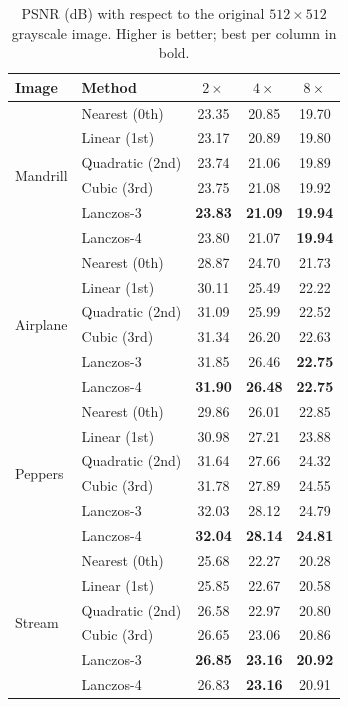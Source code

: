 \documentclass[11pt,a4paper]{article}
\begin{document}
\begin{table}[H]
\centering
\caption{PSNR (dB) with respect to the original $512\times512$ grayscale image. Higher is
better; best per column in bold.}
\label{tab:psnr}
\begin{tabular}{llccc}
\toprule
Image & Method & $2\times$ & $4\times$ & $8\times$ \\
\midrule
\multirow{6}{*}{Mandrill}
 & Nearest (0th)   & 23.35 & 20.85 & 19.70 \\
 & Linear (1st)    & 23.17 & 20.89 & 19.80 \\
 & Quadratic (2nd) & 23.74 & 21.06 & 19.89 \\
 & Cubic (3rd)     & 23.75 & 21.08 & 19.92 \\
 & Lanczos-3       & \textbf{23.83} & \textbf{21.09} & \textbf{19.94} \\
 & Lanczos-4       & 23.80 & 21.07 & \textbf{19.94} \\
\midrule
\multirow{6}{*}{Airplane}
 & Nearest (0th)   & 28.87 & 24.70 & 21.73 \\
 & Linear (1st)    & 30.11 & 25.49 & 22.22 \\
 & Quadratic (2nd) & 31.09 & 25.99 & 22.52 \\
 & Cubic (3rd)     & 31.34 & 26.20 & 22.63 \\
 & Lanczos-3       & 31.85 & 26.46 & \textbf{22.75} \\
 & Lanczos-4       & \textbf{31.90} & \textbf{26.48} & \textbf{22.75} \\
\midrule
\multirow{6}{*}{Peppers}
 & Nearest (0th)   & 29.86 & 26.01 & 22.85 \\
 & Linear (1st)    & 30.98 & 27.21 & 23.88 \\
 & Quadratic (2nd) & 31.64 & 27.66 & 24.32 \\
 & Cubic (3rd)     & 31.78 & 27.89 & 24.55 \\
 & Lanczos-3       & 32.03 & 28.12 & 24.79 \\
 & Lanczos-4       & \textbf{32.04} & \textbf{28.14} & \textbf{24.81} \\
\midrule
\multirow{6}{*}{Stream}
 & Nearest (0th)   & 25.68 & 22.27 & 20.28 \\
 & Linear (1st)    & 25.85 & 22.67 & 20.58 \\
 & Quadratic (2nd) & 26.58 & 22.97 & 20.80 \\
 & Cubic (3rd)     & 26.65 & 23.06 & 20.86 \\
 & Lanczos-3       & \textbf{26.85} & \textbf{23.16} & \textbf{20.92} \\
 & Lanczos-4       & 26.83 & \textbf{23.16} & 20.91 \\
\bottomrule
\end{tabular}
\end{table}
\end{document}
